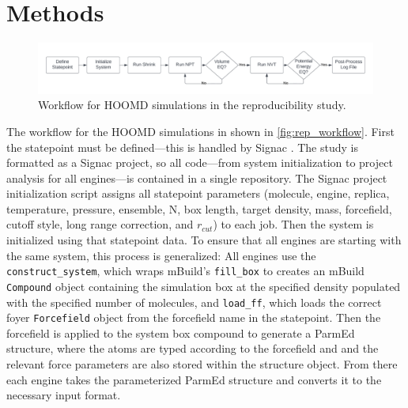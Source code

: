 \section{Methods}

\begin{figure}[h!]
    \centering
    \includegraphics[width=\linewidth,keepaspectratio]{figures/rep_study/reproducibility_workflow.png}
    \caption{Workflow for HOOMD simulations in the reproducibility study.}\label{fig:rep_workflow}
\end{figure}
The workflow for the HOOMD simulations in shown in \autoref{fig:rep_workflow}. 
First the statepoint must be defined---this is handled by Signac \cite{Adorf2018, signac_zenodo, signac_scipy_2018, signac_scipy_2021}. 
The study is formatted as a Signac project, so all code---from system initialization to project analysis for all engines---is contained in a single repository.
The Signac project initialization script assigns all statepoint parameters (molecule, engine, replica, temperature, pressure, ensemble, N, box length, target density, mass, forcefield, cutoff style, long range correction, and $r_{cut}$) to each job. 
Then the system is initialized using that statepoint data. 
To ensure that all engines are starting with the same system, this process is generalized: All engines use the \lstinline{construct_system}, which wraps mBuild's \lstinline{fill_box} to creates an mBuild \lstinline{Compound} object containing the simulation box at the specified density populated with the specified number of molecules, and \lstinline{load_ff}, which loads the correct foyer \lstinline{Forcefield} object from the forcefield name in the statepoint. 
Then the forcefield is applied to the system box compound to generate a ParmEd structure\cite{Shirts2017}, where the atoms are typed according to the forcefield and and the relevant force parameters are also stored within the structure object. 
From there each engine takes the parameterized ParmEd structure and converts it to the necessary input format. 

